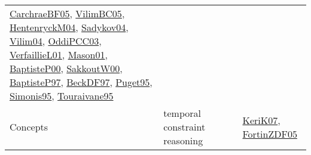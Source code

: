 {\begin{longtable}{llp{6cm}p{6cm}p{6cm}}
\href{papers/CarchraeBF05.pdf}{CarchraeBF05}\cite{CarchraeBF05}, \href{articles/VilimBC05.pdf}{VilimBC05}\cite{VilimBC05}, \href{papers/HentenryckM04.pdf}{HentenryckM04}\cite{HentenryckM04}, \href{papers/Sadykov04.pdf}{Sadykov04}\cite{Sadykov04}, \href{papers/Vilim04.pdf}{Vilim04}\cite{Vilim04}, \href{papers/OddiPCC03.pdf}{OddiPCC03}\cite{OddiPCC03}, \href{papers/VerfaillieL01.pdf}{VerfaillieL01}\cite{VerfaillieL01}, \href{articles/Mason01.pdf}{Mason01}\cite{Mason01}, \href{articles/BaptisteP00.pdf}{BaptisteP00}\cite{BaptisteP00}, \href{articles/SakkoutW00.pdf}{SakkoutW00}\cite{SakkoutW00}, \href{papers/BaptisteP97.pdf}{BaptisteP97}\cite{BaptisteP97}, \href{papers/BeckDF97.pdf}{BeckDF97}\cite{BeckDF97}, \href{papers/Puget95.pdf}{Puget95}\cite{Puget95}, \href{papers/Simonis95.pdf}{Simonis95}\cite{Simonis95}, \href{papers/Touraivane95.pdf}{Touraivane95}\cite{Touraivane95}\\
Concepts & temporal constraint reasoning &  &  & \href{papers/KeriK07.pdf}{KeriK07}\cite{KeriK07}, \href{papers/FortinZDF05.pdf}{FortinZDF05}\cite{FortinZDF05}\\

\end{longtable}}
